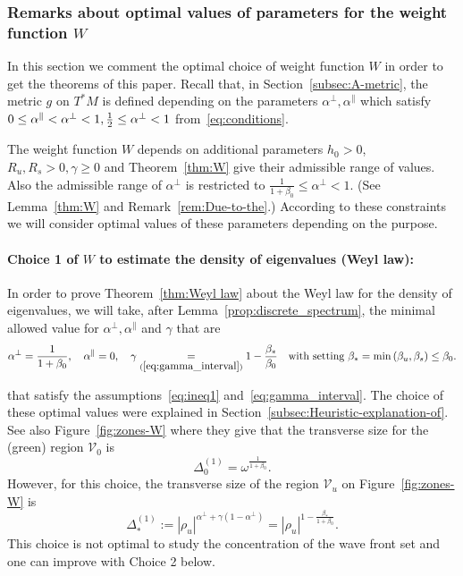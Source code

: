 \documentclass[10pt]{amsart}
\theoremstyle{definition}\newtheorem{defi}[theo]{Definition}\newtheorem{rema}[theo]{Remark}\newtheorem{exam}[theo]{Example}\newtheorem{exem}[theo]{Example}\newtheorem{nota}[theo]{Notation}
\newcommand*\eq[1]{\underset{(#1)}{=}}
\newcommand{\clV}{\mathcal{V}}
\begin{document}
\subsubsection{Remarks about optimal values of parameters for the weight function \texorpdfstring{$W$}{W}}\label{subsec:Optimal-values-of}

In this section we comment the optimal choice of weight function $W$ in order to get the theorems of this paper. Recall that, in Section~\ref{subsec:A-metric}, the metric $g$ on $T^{*}M$ is defined depending on the parameters $\alpha^{\perp},\alpha^{\parallel}$ which satisfy $0\leq\alpha^{\parallel}<\alpha^{\perp}<1,\frac{1}{2}\linebreak\leq\alpha^{\perp}<1$ from~\eqref{eq:conditions}.

The weight function $W$ depends on additional parameters $h_{0}>0$, $R_{u},R_{s}>0,\gamma\geq0$ and Theorem~\ref{thm:W} give their admissible range of values. Also the admissible range of $\alpha^{\perp}$ is restricted to $\frac{1}{1+\beta_{0}}\leq\alpha^{\perp}<1$. (See Lemma~\ref{thm:W} and Remark~\ref{rem:Due-to-the}.) According to these constraints we will consider optimal values of these parameters depending on the purpose.

\paragraph{Choice 1 of $W$ to estimate the density of eigenvalues (Weyl law):}

In order to prove Theorem~\ref{thm:Weyl law} about the Weyl law for the density of eigenvalues, we will take, after Lemma~\ref{prop:discrete_spectrum}, the minimal allowed value for $\alpha^{\perp},\alpha^{\parallel}$ and $\gamma$ that are
\[
\alpha^{\perp}=\frac{1}{1+\beta_{0}},\quad\alpha^{\parallel}=0,\quad\gamma\eq{\ref{eq:gamma_interval}}1-\frac{\beta_{*}}{\beta_{0}}\quad\text{with setting }\beta_{*}=\min\left(\beta_{u},\beta_{s}\right)\le\beta_{0}.
\]

\pagebreak

\noindent that satisfy the assumptions~\eqref{eq:ineq1} and~\eqref{eq:gamma_interval}. The choice of these optimal values were explained in Section~\ref{subsec:Heuristic-explanation-of}. See also Figure~\ref{fig:zones-W} where they give that the transverse size for the (green) region $\clV_{0}$ is
\[
\Delta_{0}^{\left(1\right)}=\omega^{\frac{1}{1+\beta_{0}}}.
\]
However, for this choice, the transverse size of the region $\clV_{u}$ on Figure~\ref{fig:zones-W} is
\begin{equation}\label{eq:Delta_1*}
\Delta_{*}^{\left(1\right)}:=\left|\rho_{u}\right|^{\alpha^{\perp}+\gamma\left(1-\alpha^{\perp}\right)}=\left|\rho_{u}\right|^{1-\frac{\beta_{*}}{1+\beta_{0}}}.
\end{equation}
This choice is not optimal to study the concentration of the wave front set and one can improve with Choice 2 below.
\end{document}
